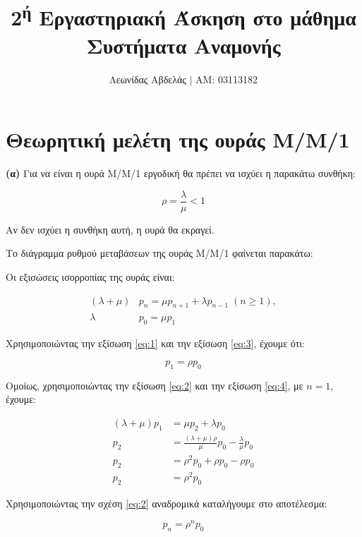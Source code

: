 \documentclass {article}
\title{2\textsuperscript{ή} Εργαστηριακή Άσκηση στο μάθημα
Συστήματα Αναμονής}
\author{Λεωνίδας Αβδελάς $|$ AM: 03113182}
\date{}
\begin{document}

\maketitle


\section*{Θεωρητική μελέτη της ουράς Μ/Μ/1}	

\textbf{(α)} Για να είναι η ουρά Μ/Μ/1 εργοδική θα πρέπει να ισχύει η παρακάτω συνθήκη:

\begin{equation} \label{eq:1}
    ρ = \frac{λ}{μ} < 1
\end{equation}

Αν δεν ισχύει η συνθήκη αυτή, η ουρά θα εκραγεί.

Το διάγραμμα ρυθμού μεταβάσεων της ουράς Μ/Μ/1 φαίνεται παρακάτω:   

 

Οι εξισώσεις ισορροπίας της ουράς είναι:

\begin{align} 
	(λ + μ) & p_n = μp_{n+1} + λp_{n-1} \; (n \geq 1), \label{eq:2}\\
	λ & p_{0} = μp_{1} \label{eq:3}
\end{align} 

Χρησιμοποιώντας την εξίσωση \ref{eq:1} και την εξίσωση \ref{eq:3}, έχουμε ότι:

\begin{equation} \label{eq:4}
	p_1 = ρp_0
\end{equation}

Ομοίως, χρησιμοποιώντας την εξίσωση \ref{eq:2} και την εξίσωση \ref{eq:4}, με $n = 1$, έχουμε:

\begin{align*}
	(λ + μ) p_1 & = μp_2 + λp_0 \\
	p_2 & = \frac{(λ+μ) ρ}{μ} p_0 - \frac{λ}{μ}p_0 \\
	p_2 & = ρ^2p_0 + ρp_0 - ρp_0 \\
	p_2 & = ρ^2 p_0
\end{align*}

Χρησιμοποιώντας την σχέση \ref{eq:2} αναδρομικά καταλήγουμε στο αποτέλεσμα:

\begin{equation}\label{eq:5}
	p_n = ρ^np_0 
\end{equation}
\end{document}
